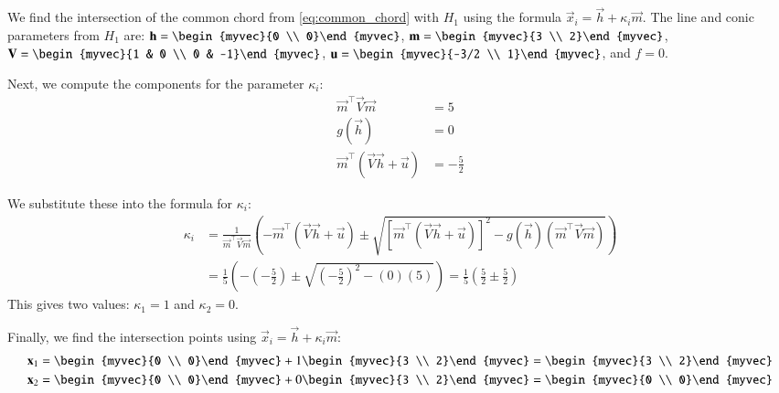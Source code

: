 \documentclass[journal]{IEEEtran}
\begin{document}
	We find the intersection of the common chord from \eqref{eq:common_chord} with $H_1$ using the formula $\vec{x}_i = \vec{h} + \kappa_i\vec{m}$.
	The line and conic parameters from $H_1$ are:
	$\vec{h} = \begin{myvec}{0 \\ 0}\end{myvec}$, $\vec{m} = \begin{myvec}{3 \\ 2}\end{myvec}$, $\vec{V} = \begin{myvec}{1 & 0 \\ 0 & -1}\end{myvec}$, $\vec{u} = \begin{myvec}{-3/2 \\ 1}\end{myvec}$, and $f = 0$.
	
	Next, we compute the components for the parameter $\kappa_i$:
	\begin{align}
		\vec{m}^\top\vec{V}\vec{m} &= 5 \\
		g(\vec{h}) &= 0 \\
		\vec{m}^\top(\vec{V}\vec{h} + \vec{u}) &= -\frac{5}{2}
	\end{align}
	
	We substitute these into the formula for $\kappa_i$:
	\begin{align}
		\kappa_i &= \frac{1}{\vec{m}^\top\vec{V}\vec{m}} \left( - \vec{m}^\top(\vec{V}\vec{h} + \vec{u}) \pm \sqrt{[\vec{m}^\top(\vec{V}\vec{h} + \vec{u})]^2 - g(\vec{h})(\vec{m}^\top\vec{V}\vec{m})} \right) \nonumber \\
		&= \frac{1}{5} \left( -(-\frac{5}{2}) \pm \sqrt{(-\frac{5}{2})^2 - (0)(5)} \right) = \frac{1}{5} \left( \frac{5}{2} \pm \frac{5}{2} \right)
	\end{align}
	This gives two values: $\kappa_1 = 1$ and $\kappa_2 = 0$.
	
	Finally, we find the intersection points using $\vec{x}_i = \vec{h} + \kappa_i\vec{m}$:
	\begin{align}
		\vec{x}_1 &= \begin{myvec}{0 \\ 0}\end{myvec} + 1 \begin{myvec}{3 \\ 2}\end{myvec} = \begin{myvec}{3 \\ 2}\end{myvec} \label{eq:sol1} \\
		\vec{x}_2 &= \begin{myvec}{0 \\ 0}\end{myvec} + 0 \begin{myvec}{3 \\ 2}\end{myvec} = \begin{myvec}{0 \\ 0}\end{myvec} \label{eq:sol2}
	\end{align}
	
\end{document}
